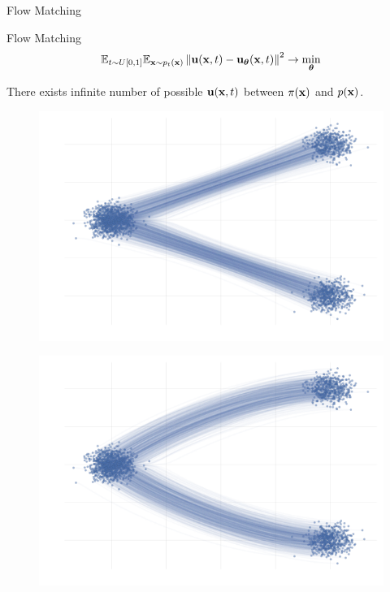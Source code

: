 \begin{frame}{Flow Matching}
	\begin{block}{Flow Matching}
		\[
			\mathbb{E}_{t \sim U[0, 1]} \mathbb{E}_{\mathbf{x} \sim p_t(\mathbf{x})}\left\| \mathbf{u}(\mathbf{x}, t) - \mathbf{u}_{\boldsymbol{\theta}}(\mathbf{x}, t) \right\|^2 \rightarrow \min_{\boldsymbol{\theta}}
		\]
	\end{block}
	There exists infinite number of possible $\mathbf{u}(\mathbf{x}, t)$ between $\pi(\mathbf{x})$ and $p(\mathbf{x})$.
	\begin{minipage}[t]{0.5\columnwidth}
		\begin{figure}
			\centering
			\includegraphics[width=\linewidth]{figs/non_uniqueness1}
		\end{figure}
	\end{minipage}%
	\begin{minipage}[t]{0.5\columnwidth}
		\begin{figure}
			\centering
			\includegraphics[width=\linewidth]{figs/non_uniqueness2}
		\end{figure}
	\end{minipage}
\end{frame}

